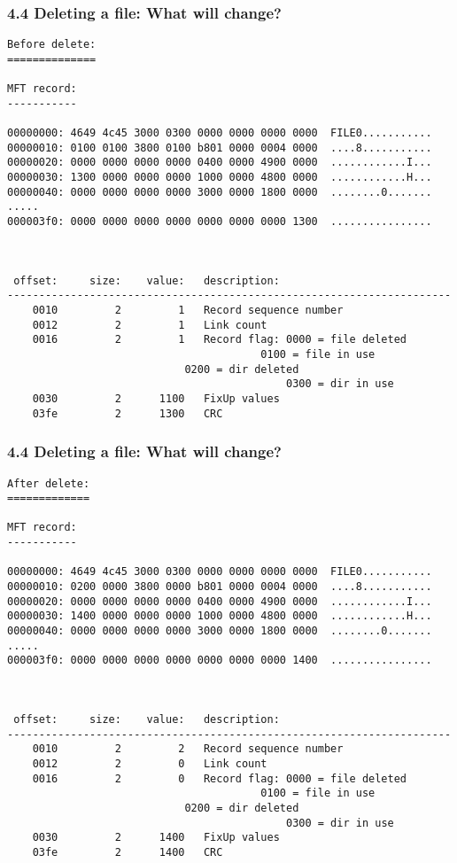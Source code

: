 \begin{frame}[fragile]
  \frametitle{4.4 Deleting a file: What will change?}
  \begin{lstlisting}[basicstyle=\tiny]
Before delete:
==============
  
MFT record:
-----------

00000000: 4649 4c45 3000 0300 0000 0000 0000 0000  FILE0...........
00000010: 0100 0100 3800 0100 b801 0000 0004 0000  ....8...........
00000020: 0000 0000 0000 0000 0400 0000 4900 0000  ............I...
00000030: 1300 0000 0000 0000 1000 0000 4800 0000  ............H...
00000040: 0000 0000 0000 0000 3000 0000 1800 0000  ........0.......
.....
000003f0: 0000 0000 0000 0000 0000 0000 0000 1300  ................



 offset:     size:    value:   description:
----------------------------------------------------------------------
    0010         2         1   Record sequence number
    0012         2         1   Link count
    0016         2         1   Record flag: 0000 = file deleted
	                                    0100 = file in use
				            0200 = dir deleted
                                            0300 = dir in use
    0030         2      1100   FixUp values
    03fe         2      1300   CRC
  \end{lstlisting}
\end{frame}


\begin{frame}[fragile]
  \frametitle{4.4 Deleting a file: What will change?}
  \begin{lstlisting}[basicstyle=\tiny]
After delete:
=============
  
MFT record:
-----------

00000000: 4649 4c45 3000 0300 0000 0000 0000 0000  FILE0...........
00000010: 0200 0000 3800 0000 b801 0000 0004 0000  ....8...........
00000020: 0000 0000 0000 0000 0400 0000 4900 0000  ............I...
00000030: 1400 0000 0000 0000 1000 0000 4800 0000  ............H...
00000040: 0000 0000 0000 0000 3000 0000 1800 0000  ........0.......
.....
000003f0: 0000 0000 0000 0000 0000 0000 0000 1400  ................



 offset:     size:    value:   description:
----------------------------------------------------------------------
    0010         2         2   Record sequence number
    0012         2         0   Link count
    0016         2         0   Record flag: 0000 = file deleted
	                                    0100 = file in use
				            0200 = dir deleted
                                            0300 = dir in use
    0030         2      1400   FixUp values
    03fe         2      1400   CRC
  \end{lstlisting}
\end{frame}


